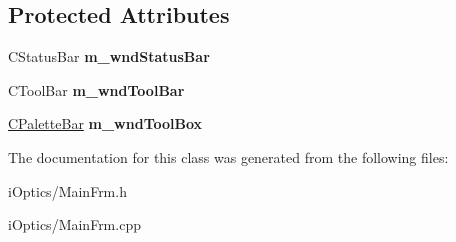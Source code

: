 \subsection*{Protected Attributes}
\begin{DoxyCompactItemize}
\item 
\mbox{\label{class_c_main_frame_ac01bafc03aee69cf982e6f029b4db6b0}} 
C\+Status\+Bar {\bfseries m\+\_\+wnd\+Status\+Bar}
\item 
\mbox{\label{class_c_main_frame_a73024d794dce2fe918f6b117371c25fc}} 
C\+Tool\+Bar {\bfseries m\+\_\+wnd\+Tool\+Bar}
\item 
\mbox{\label{class_c_main_frame_aa9c4f31a06e06b7f0ee53b21b449a5d3}} 
\mbox{\hyperlink{class_c_palette_bar}{C\+Palette\+Bar}} {\bfseries m\+\_\+wnd\+Tool\+Box}
\end{DoxyCompactItemize}


The documentation for this class was generated from the following files\+:\begin{DoxyCompactItemize}
\item 
i\+Optics/Main\+Frm.\+h\item 
i\+Optics/Main\+Frm.\+cpp\end{DoxyCompactItemize}

